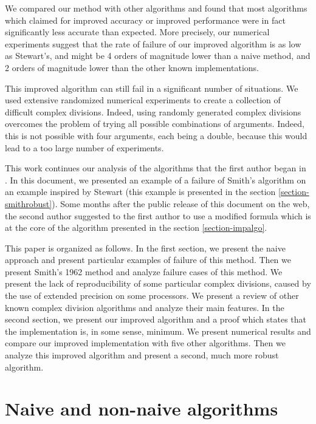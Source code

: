 \documentclass{paper}
\begin{document}
We compared our method with other algorithms and 
found that most algorithms which claimed for improved accuracy 
or improved performance were in fact significantly less 
accurate than expected. 
More precisely, our numerical experiments suggest that 
the rate of failure of our improved algorithm is as low 
as Stewart's, and might be 4 orders of magnitude lower than 
a naive method, and 2 orders of magnitude lower than 
the other known implementations.

This improved algorithm can still fail in a significant 
number of situations. 
We used extensive randomized numerical experiments to create 
a collection of difficult complex divisions. 
Indeed, using randomly generated complex divisions 
overcomes the problem of trying all possible combinations 
of arguments.
Indeed, this is not possible with four arguments, each being a double, 
because this would lead to a too large number of experiments. 

This work continues our analysis of the algorithms that the first 
author began in \cite{BaudinScinaive2010}. 
In this document, we presented an example of a failure of 
Smith's algorithm on an example inspired by Stewart (this example 
is presented in the section \ref{section-smithrobust}). 
Some months after the public release of this document on the web, the 
second author \cite{Smith1962} suggested to the first author 
to use a modified formula which is at the core of the algorithm 
presented in the section \ref{section-impalgo}.

This paper is organized as follows. 
In the first section, we present the naive approach and 
present particular examples of failure of this method. 
Then we present Smith's 1962 method and analyze failure 
cases of this method. 
We present the lack of reproducibility 
of some particular complex divisions, caused by the use 
of extended precision on some processors. 
We present a review of other known complex division algorithms 
and analyze their main features. 
In the second section, we present our improved algorithm 
and a proof which states that the implementation is, in 
some sense, minimum. 
We present numerical results and compare our improved implementation 
with five other algorithms. 
Then we analyze this improved algorithm and present a second, 
much more robust algorithm. 

\section{Naive and non-naive algorithms}
\end{document}
